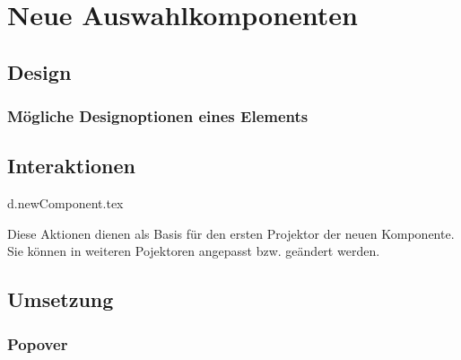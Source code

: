 \chapter{Neue Auswahlkomponenten}

\section{Design}

\subsection{Mögliche Designoptionen eines Elements}



\section{Interaktionen}

{d.newComponent.tex}

Diese Aktionen dienen als Basis für den ersten Projektor der neuen Komponente. 
Sie können in weiteren Pojektoren angepasst bzw. geändert werden.



\section{Umsetzung}

\subsection{Popover}
